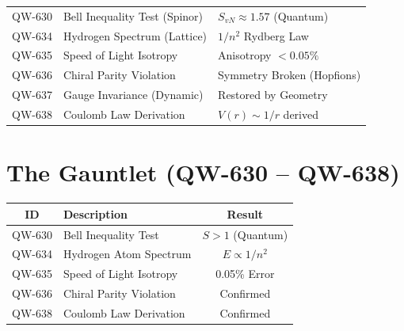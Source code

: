\documentclass[11pt, a4paper]{report}
\begin{document}
\begin{small}
\begin{longtable}{|p{2cm}|p{8cm}|p{4cm}|}
\hline
QW-630 & Bell Inequality Test (Spinor) & $S_{vN} \approx 1.57$ (Quantum) \\
QW-634 & Hydrogen Spectrum (Lattice) & $1/n^2$ Rydberg Law \\
QW-635 & Speed of Light Isotropy & Anisotropy $< 0.05\%$ \\
QW-636 & Chiral Parity Violation & Symmetry Broken (Hopfions) \\
QW-637 & Gauge Invariance (Dynamic) & Restored by Geometry \\
QW-638 & Coulomb Law Derivation & $V(r) \sim 1/r$ derived \\
\hline
\end{longtable}
\end{small}

\section*{The Gauntlet (QW-630 -- QW-638)}
\begin{longtable}{|c|p{8cm}|c|}
\hline
\textbf{ID} & \textbf{Description} & \textbf{Result} \\
\hline
QW-630 & Bell Inequality Test & $S > 1$ (Quantum) \\
QW-634 & Hydrogen Atom Spectrum & $E \propto 1/n^2$ \\
QW-635 & Speed of Light Isotropy & 0.05\% Error \\
QW-636 & Chiral Parity Violation & Confirmed \\
QW-638 & Coulomb Law Derivation & Confirmed \\
\hline
\end{longtable}
\end{document}
